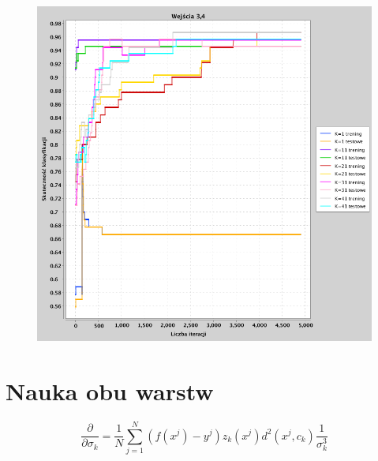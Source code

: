 \documentclass[a4paper, portrait,11pt]{article}
\begin{document}
\begin{figure}[!htb]
\begin{minipage}{0.33\textwidth}
    \caption{\label{fig:41_2_2,4}}
  \end{minipage}
  \begin{minipage}{0.33\textwidth}
    \centering
    \includegraphics[width=1\linewidth]{../data/classification4/1/2_3,4.png}
    \caption{\label{fig:41_2_3,4}}
  \end{minipage}\hfill
\end{figure}


\section{Nauka obu warstw}
\newcommand{\partialSigma}{\frac{\partial}{\partial{\sigma_{k}}}}
\begin{equation}
  \partialSigma = \frac{1}{N} \sum_{j=1}^{N}  (f(x^j) - y^j) z_k(x^j) d^2(x^j, c_k) \frac{1}{\sigma_{k}^3}
\end{equation}
\end{document}

